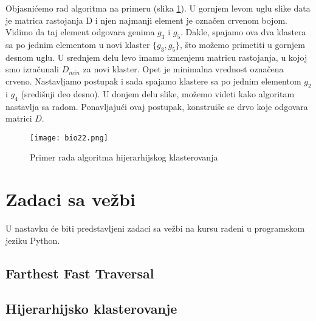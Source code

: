 Objasnićemo rad algoritma na primeru (slika \ref{slika 22}). U gornjem levom uglu slike data je matrica rastojanja D i njen najmanji element je označen crvenom bojom. Vidimo da taj element odgovara genima $g_3$ i $g_5$. Dakle, spajamo ova dva klastera sa po jednim elementom u novi klaster $\{g_3,g_5\}$, što možemo primetiti u gornjem desnom uglu. U srednjem delu levo imamo izmenjenu matricu rastojanja, u kojoj smo izračunali $D_{min}$ za novi klaster. Opet je minimalna vrednost označena crveno. Nastavljamo postupak i sada spajamo klastere sa po jednim elementom $g_2$ i $g_4$ (središnji deo desno). U donjem delu slike, možemo videti kako algoritam nastavlja sa radom. Ponavljajući ovaj postupak, konstruiše se drvo koje odgovara matrici $D$.
\newpage
\begin{figure}[h!]
    \centering
    \texttt{[image: bio22.png]}
    \caption{Primer rada algoritma hijerarhijskog klasterovanja}
    \label{slika 22}
\end{figure}
	
\section{Zadaci sa vežbi}
\setexamplecodestyle

U nastavku će biti predstavljeni zadaci sa vežbi na kursu rađeni u programskom jeziku Python.

\subsection{Farthest Fast Traversal}

\subsection{Hijerarhijsko klasterovanje}	

	
	


